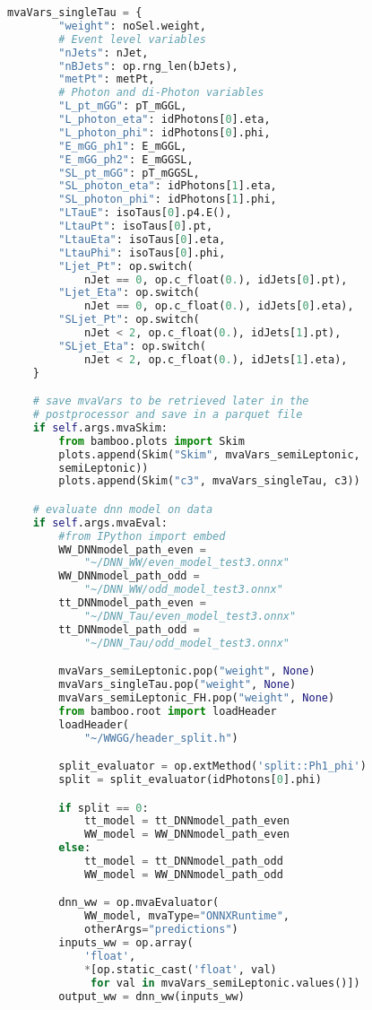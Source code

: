 \begin{lstlisting}[language=Python, caption=Python module of the analysis used in Bamboo framework, label={bamboocode}]
    mvaVars_singleTau = {
        "weight": noSel.weight,
        # Event level variables
        "nJets": nJet,
        "nBJets": op.rng_len(bJets),
        "metPt": metPt,
        # Photon and di-Photon variables
        "L_pt_mGG": pT_mGGL,
        "L_photon_eta": idPhotons[0].eta,
        "L_photon_phi": idPhotons[0].phi,
        "E_mGG_ph1": E_mGGL,
        "E_mGG_ph2": E_mGGSL,
        "SL_pt_mGG": pT_mGGSL,
        "SL_photon_eta": idPhotons[1].eta,
        "SL_photon_phi": idPhotons[1].phi,
        "LTauE": isoTaus[0].p4.E(),
        "LtauPt": isoTaus[0].pt,
        "LtauEta": isoTaus[0].eta,
        "LtauPhi": isoTaus[0].phi,
        "Ljet_Pt": op.switch(
            nJet == 0, op.c_float(0.), idJets[0].pt),
        "Ljet_Eta": op.switch(
            nJet == 0, op.c_float(0.), idJets[0].eta),
        "SLjet_Pt": op.switch(
            nJet < 2, op.c_float(0.), idJets[1].pt),
        "SLjet_Eta": op.switch(
            nJet < 2, op.c_float(0.), idJets[1].eta),
    }

    # save mvaVars to be retrieved later in the
    # postprocessor and save in a parquet file
    if self.args.mvaSkim:
        from bamboo.plots import Skim
        plots.append(Skim("Skim", mvaVars_semiLeptonic, 
        semiLeptonic))
        plots.append(Skim("c3", mvaVars_singleTau, c3))

    # evaluate dnn model on data
    if self.args.mvaEval:
        #from IPython import embed
        WW_DNNmodel_path_even = 
            "~/DNN_WW/even_model_test3.onnx"
        WW_DNNmodel_path_odd = 
            "~/DNN_WW/odd_model_test3.onnx"
        tt_DNNmodel_path_even = 
            "~/DNN_Tau/even_model_test3.onnx"
        tt_DNNmodel_path_odd = 
            "~/DNN_Tau/odd_model_test3.onnx"

        mvaVars_semiLeptonic.pop("weight", None)
        mvaVars_singleTau.pop("weight", None)
        mvaVars_semiLeptonic_FH.pop("weight", None)
        from bamboo.root import loadHeader
        loadHeader(
            "~/WWGG/header_split.h")

        split_evaluator = op.extMethod('split::Ph1_phi')
        split = split_evaluator(idPhotons[0].phi)

        if split == 0:
            tt_model = tt_DNNmodel_path_even
            WW_model = WW_DNNmodel_path_even
        else:
            tt_model = tt_DNNmodel_path_odd
            WW_model = WW_DNNmodel_path_odd

        dnn_ww = op.mvaEvaluator(
            WW_model, mvaType="ONNXRuntime",
            otherArgs="predictions")
        inputs_ww = op.array(
            'float',
            *[op.static_cast('float', val)
             for val in mvaVars_semiLeptonic.values()])
        output_ww = dnn_ww(inputs_ww)


\end{lstlisting}
